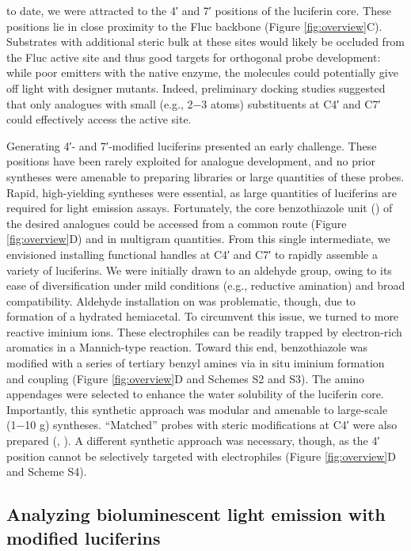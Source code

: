 to date, we were attracted to the 4′ and 7′ positions of the
luciferin core. These positions lie in close proximity to the Fluc
backbone (Figure \ref{fig:overview}C). Substrates with additional steric bulk at
these sites would likely be occluded from the Fluc active site
and thus good targets for orthogonal probe development: while
poor emitters with the native enzyme, the molecules could
potentially give off light with designer mutants. Indeed,
preliminary docking studies suggested that only analogues
with small (e.g., 2−3 atoms) substituents at C4′ and C7′ could
effectively access the active site.
\par
Generating 4′- and 7′-modified luciferins presented an early
challenge. These positions have been rarely exploited for
analogue development, and no prior syntheses were amenable
to preparing libraries or large quantities of these probes. Rapid,
high-yielding syntheses were essential, as large quantities of
luciferins are required for light emission assays. Fortunately, the
core benzothiazole unit () of the desired analogues could
be accessed from a common route (Figure \ref{fig:overview}D) and in
multigram quantities.\cite{McCutcheon:2015bs, McCutcheon:2012ix} From this single intermediate, we
envisioned installing functional handles at C4′ and C7′ to
rapidly assemble a variety of luciferins. We were initially drawn
to an aldehyde group, owing to its ease of diversification under
mild conditions (e.g., reductive amination) and broad
compatibility. Aldehyde installation on  was problematic,
though, due to formation of a hydrated hemiacetal.\cite{Jones:1981cm} To circumvent this issue, we turned to more reactive
iminium ions. These electrophiles can be readily trapped by
electron-rich aromatics in a Mannich-type reaction.\cite{Phillips:1956fo} Toward this end, benzothiazole  was modified with a series of tertiary
benzyl amines via in situ iminium formation and coupling
(Figure \ref{fig:overview}D and Schemes S2 and S3). The amino appendages
were selected to enhance the water solubility of the luciferin
core. Importantly, this synthetic approach was modular and
amenable to large-scale (1−10 g) syntheses. “Matched” probes
with steric modifications at C4′ were also prepared (, ). A
different synthetic approach was necessary, though, as the 4′
position cannot be selectively targeted with electrophiles
(Figure \ref{fig:overview}D and Scheme S4).

\subsection*{Analyzing bioluminescent light emission with modified luciferins}

